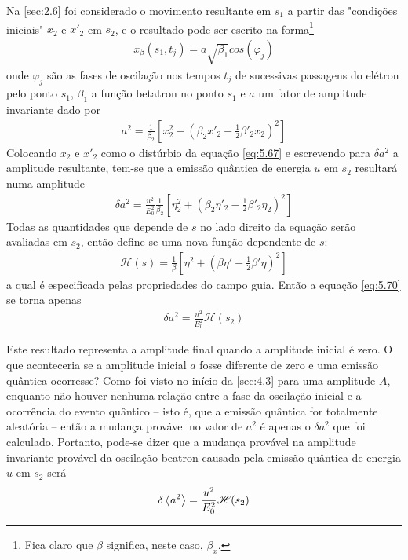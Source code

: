 Na \autoref{sec:2.6} foi considerado o movimento resultante em $s_1$ a partir das "condições iniciais" $x_2$ e $x'_2$ em $s_2$, e o resultado pode ser escrito na forma\footnote{Fica claro que $\beta$ significa, neste caso, $\beta_x$.}
\begin{align}
	x_\beta(s_1, t_j) = a\sqrt{\beta_1}cos(\varphi_j)\label{eq:5.68}
\end{align}
onde $\varphi_j$ são as fases de oscilação nos tempos $t_j$ de sucessivas passagens  do elétron pelo ponto $s_1$, $\beta_1$ a função betatron no ponto $s_1$ e $a$ um fator de amplitude invariante dado por
\begin{align}
	a^2 = \frac{1}{\beta_2}\left[x_2^2 + \left(\beta_2 x'_2 - \frac{1}{2}\beta'_2 x_2\right)^2\right]
\end{align}
Colocando $x_2$ e $x'_2$ como o distúrbio da equação \eqref{eq:5.67} e escrevendo para $\delta a^2$ a amplitude resultante, tem-se que a emissão quântica de energia $u$ em $s_2$ resultará numa amplitude
\begin{align}
	\delta a^2 = \frac{u^2}{E_0^2}\frac{1}{\beta_2}\left[\eta_2^2 + \left(\beta_2 \eta'_2 - \frac{1}{2}\beta'_2 \eta_2\right)^2\right]\label{eq:5.70}
\end{align}
Todas as quantidades que depende de $s$ no lado direito da equação serão avaliadas em $s_2$, então define-se uma nova função dependente de $s$:
\begin{align}
	\mathscr{H}(s) = \frac{1}{\beta}\left[\eta^2 + \left(\beta \eta' - \frac{1}{2}\beta' \eta\right)^2\right]\label{eq:5.71}
\end{align}
a qual é especificada pelas propriedades do campo guia. Então a equação \eqref{eq:5.70} se torna apenas
\begin{align}
	\delta a^2 = \frac{u^2}{E_0^2}\mathscr{H}(s_2)
\end{align}

Este resultado representa a amplitude final quando a amplitude inicial é zero. O que aconteceria se a amplitude inicial $a$ fosse diferente de zero e uma emissão quântica ocorresse? Como foi visto no início da \autoref{sec:4.3} para uma amplitude $A$, enquanto não houver nenhuma relação entre a fase da oscilação inicial e a ocorrência do evento quântico -- isto é, que a emissão quântica for totalmente aleatória -- então a mudança provável no valor de $a^2$ é apenas o $\delta a^2$ que foi calculado. Portanto, pode-se dizer que a mudança provável na amplitude invariante provável da oscilação beatron causada pela emissão quântica de energia $u$ em $s_2$ será
\begin{align}
	\delta \left< a^2 \right> = \frac{u^2}{E_0^2}\mathscr{H}(s_2)\label{eq:5.73}
\end{align}

